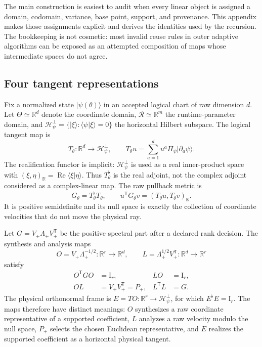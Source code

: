 \documentclass[10pt,twocolumn]{article}
\theoremstyle{definition}
\theoremstyle{remark}
\newcommand{\R}{\mathbb R}
\newcommand{\Hh}{\mathcal H}
\newcommand{\Id}{\mathrm I}
\newcommand{\Rea}{\operatorname{Re}}
\begin{document}
The main construction is easiest to audit when every linear object is assigned
a domain, codomain, variance, base point, support, and provenance.  This
appendix makes those assignments explicit and derives the identities used by
the recursion.  The bookkeeping is not cosmetic: most invalid reuse rules in
outer adaptive algorithms can be exposed as an attempted composition of maps
whose intermediate spaces do not agree.

\subsection{Four tangent representations}

Fix a normalized state $|\psi(\theta)\rangle$ in an accepted logical chart of
raw dimension $d$.  Let $\Theta\simeq\R^d$ denote the coordinate domain,
$\mathcal R\simeq\R^m$ the runtime-parameter domain, and
$\Hh_\psi^\perp=\{|\xi\rangle:\langle\psi|\xi\rangle=0\}$ the horizontal
Hilbert subspace.  The logical tangent map is
\begin{equation}
 T_\theta:\R^d\longrightarrow\Hh_\psi^\perp,\qquad
 T_\theta u=\sum_{a=1}^d u^a\Pi_\psi|\partial_a\psi\rangle .
 \label{eq:apptangent}
\end{equation}
The realification functor is implicit: $\Hh_\psi^\perp$ is used as a real
inner-product space with $(\xi,\eta)_{\R}=\Rea\langle\xi|\eta\rangle$.  Thus
$T_\theta^\flat$ is the real adjoint, not the complex adjoint considered as a
complex-linear map.  The raw pullback metric is
\begin{equation}
 G_\theta=T_\theta^\flat T_\theta,\qquad
 u^{\mathsf T}G_\theta v=(T_\theta u,T_\theta v)_\R.
 \label{eq:appgram}
\end{equation}
It is positive semidefinite and its null space is exactly the collection of
coordinate velocities that do not move the physical ray.

Let $G=V_+\Lambda_+V_+^{\mathsf T}$ be the positive spectral part after a
declared rank decision.  The synthesis and analysis maps
\begin{equation}
 O=V_+\Lambda_+^{-1/2}:\R^r\to\R^d,\qquad
 L=\Lambda_+^{1/2}V_+^{\mathsf T}:\R^d\to\R^r
 \label{eq:appOL}
\end{equation}
satisfy
\begin{align}
 O^{\mathsf T}GO&=\Id_r,& LO&=\Id_r,\nonumber\\
 OL&=V_+V_+^{\mathsf T}=P_+,& L^{\mathsf T}L&=G .
 \label{eq:appOLidentities}
\end{align}
The physical orthonormal frame is $E=TO:\R^r\to\Hh_\psi^\perp$, for which
$E^\flat E=\Id_r$.  The maps therefore have distinct meanings:
$O$ synthesizes a raw coordinate representative of a supported coefficient,
$L$ analyzes a raw velocity modulo the null space, $P_+$ selects the chosen
Euclidean representative, and $E$ realizes the supported coefficient as a
horizontal physical tangent.
\end{document}
